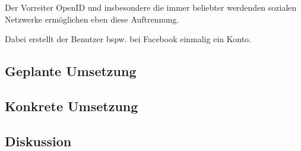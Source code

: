 Der Vorreiter OpenID \cite{OpenID} und insbesondere die immer beliebter werdenden sozialen Netzwerke ermöglichen eben diese Auftrennung.

Dabei erstellt der Benutzer bspw. bei Facebook einmalig ein Konto.


\subsection*{Geplante Umsetzung}


\subsection*{Konkrete Umsetzung}


\subsection*{Diskussion}
